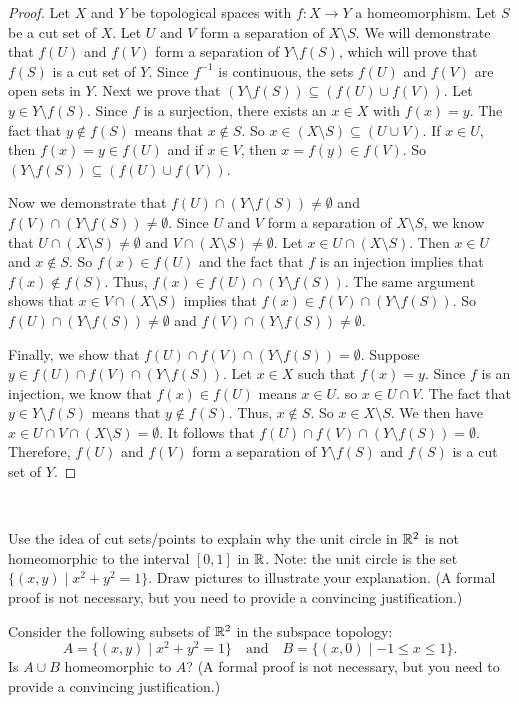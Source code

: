 \begin{proof} Let $X$ and $Y$ be topological spaces with $f : X \to Y$ a homeomorphism. Let $S$ be a cut set of $X$. Let $U$ and $V$ form a separation of $X \setminus S$. We will demonstrate that $f(U)$ and $f(V)$ form a separation of $Y \setminus f(S)$, which will prove that $f(S)$ is a cut set of $Y$. Since $f^{-1}$ is continuous, the sets $f(U)$ and $f(V)$ are open sets in $Y$. Next we prove that $(Y \setminus f(S)) \subseteq (f(U) \cup f(V))$. Let $y \in Y \setminus f(S)$. Since $f$ is a surjection, there exists an $x \in X$ with $f(x) = y$. The fact that $y \notin f(S)$ means that $x \notin S$. So $x \in (X \setminus S) \subseteq (U \cup V)$. If $x \in U$, then $f(x) = y \in f(U)$ and if $x \in V$, then $x = f(y) \in f(V)$. So $(Y \setminus f(S)) \subseteq (f(U) \cup f(V))$. 

Now we demonstrate that $f(U) \cap (Y \setminus f(S)) \neq \emptyset$ and $f(V) \cap (Y \setminus f(S)) \neq \emptyset$. Since $U$ and $V$ form a separation of $X \setminus S$, we know that $U \cap (X \setminus S) \neq \emptyset$ and $V \cap (X \setminus S) \neq \emptyset$. Let $x \in U \cap (X \setminus S)$. Then $x \in U$ and $x \notin S$. So $f(x) \in f(U)$ and the fact that $f$ is an injection implies that $f(x) \notin f(S)$. Thus, $f(x) \in f(U) \cap (Y \setminus f(S))$. The same argument shows that $x \in V \cap (X \setminus S)$ implies that $f(x) \in f(V) \cap (Y \setminus f(S))$. So $f(U) \cap (Y \setminus f(S)) \neq \emptyset$ and $f(V) \cap (Y \setminus f(S)) \neq \emptyset$. 

Finally, we show that $f(U) \cap f(V) \cap (Y \setminus f(S)) = \emptyset$. Suppose $y \in f(U) \cap f(V) \cap (Y \setminus f(S))$. Let $x \in X$ such that $f(x) = y$. Since $f$ is an injection, we know that $f(x) \in f(U)$ means $x \in U$. so $x \in U \cap V$. The fact that $y \in Y \setminus f(S)$ means that $y \notin f(S)$. Thus, $x \notin S$. So $x \in X \setminus S$. We then have $x \in U \cap V \cap (X \setminus S) = \emptyset$. It follows that $f(U) \cap f(V) \cap (Y \setminus f(S)) = \emptyset$. Therefore, $f(U)$ and $f(V)$ form a separation of $Y \setminus f(S)$ and $f(S)$ is a cut set of $Y$. 

\end{proof}


\begin{activity} ~
\ba
	\item Use the idea of cut sets/points to explain why the unit circle in $\mathbb{R}^2$ is not homeomorphic to the interval $[0,1]$ in $\mathbb{R}$. Note: the unit circle is the set $\{(x,y) \mid x^2+y^2 = 1\}$. Draw pictures to illustrate your explanation. (A formal proof is not necessary, but you need to provide a convincing justification.)

	\item Consider the following subsets of $\mathbb{R}^2$ in the subspace topology: 
\[A = \{ (x,y) \mid x^2+y^2 =1\} \ \ \ \text{ and } \ \ \ B = \{ (x,0) \mid -1 \leq x \leq 1\}.\]
Is $A \cup B$ homeomorphic to $A$? (A formal proof is not necessary, but you need to provide a convincing justification.)
 
\ea

\end{activity}

